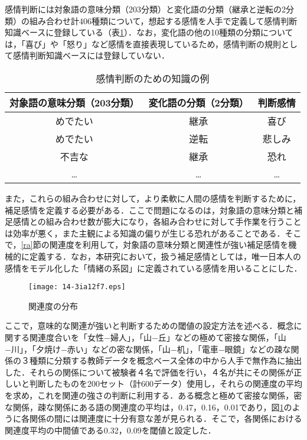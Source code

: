 \documentclass[japanese]{jnlp_1.3a}
\begin{document}
感情判断には対象語の意味分類（203分類）と変化語の分類（継承と逆転の2分類）の組み合わせ計406種類について，想起する感情を人手で定義して感情判断知識ベースに登録している（表\ref{example_of_emotion_table}）．なお，変化語の他の10種類の分類については，「喜び」や「怒り」など感情を直接表現しているため，感情判断の規則として感情判断知識ベースには登録していない．

\begin{table}[b]
\caption{感情判断のための知識の例}
\label{example_of_emotion_table}
\begin{center}
\begin{tabular}{|c|c|c|} \hline
対象語の意味分類（203分類） & 変化語の分類（2分類）& 判断感情 \\ \hline\hline
めでたい & 継承 & 喜び \\ \hline
めでたい & 逆転 & 悲しみ \\ \hline
不吉な & 継承 & 恐れ \\ \hline
… & … & … \\ \hline
\end{tabular}
\end{center}
\end{table}

また，これらの組み合わせに対して，より柔軟に人間の感情を判断するために，補足感情を定義する必要がある．ここで問題になるのは，対象語の意味分類と補足感情との組み合わせ数が膨大になり，各組み合わせに対して手作業を行うことは効率が悪く，また主観による知識の偏りが生じる恐れがあることである．そこで，\ref{ra}節の関連度を利用して，対象語の意味分類と関連性が強い補足感情を機械的に定義する．なお，本研究において，扱う補足感情としては，唯一日本人の感情をモデル化した「情緒の系図」\cite{iki:91}に定義されている感情を用いることにした．


\begin{figure}[b]
\begin{center}
    \texttt{[image: 14-3ia12f7.eps]}
\end{center}
\caption{関連度の分布}
\label{degree_of_assosiation_average_example}
\end{figure}

ここで，意味的な関連が強いと判断するための閾値の設定方法を述べる．概念に関する関連度合いを「女性−婦人」，「山−丘」などの極めて密接な関係，「山−川」，「夕焼け−赤い」などの密な関係，「山−机」，「電車−眼鏡」などの疎な関係の３種類に分類する教師データを概念ベース全体の中から人手で無作為に抽出した．それらの関係について被験者４名で評価を行い，４名が共にその関係が正しいと判断したものを200セット（計600データ）使用し，それらの関連度の平均を求め，これを関連の強さの判断に利用する．ある概念と極めて密接な関係，密な関係，疎な関係にある語の関連度の平均は，0.47，0.16，0.01であり，図\ref{degree_of_assosiation_average_example}のように各関係の間には関連度に十分有意な差が見られる．そこで，各関係における関連度平均の中間値である0.32，0.09を閾値と設定した．
\end{document}

